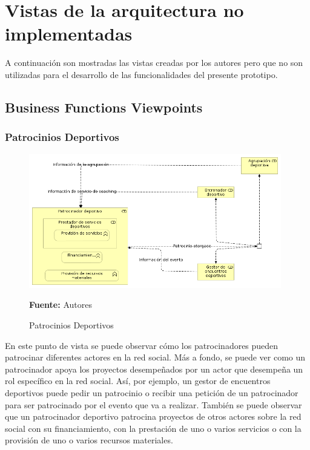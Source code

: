 \chapter{Vistas de la arquitectura no implementadas}
\label{app:vistas_no_implementadas}

A continuación son mostradas las vistas creadas por los autores pero que no son utilizadas para el desarrollo de las funcionalidades del presente prototipo.

\section{Business Functions Viewpoints}

\subsection{Patrocinios Deportivos}

\begin{figure}[!htb]
  \begin{center}
    \includegraphics[width=11cm]{./imagenes/business_functions/patrociniosdeportivos.png}
    \caption{Patrocinios Deportivos}
    \label{fig:bf_patrocinios_deportivos}
    \textbf{Fuente:}  Autores
  \end{center}
\end{figure}

En este punto de vista se puede observar cómo los patrocinadores pueden patrocinar diferentes actores en la red social. Más a fondo, se puede ver como un patrocinador apoya los proyectos desempeñados por un actor que desempeña un rol específico en la red social. Así, por ejemplo, un gestor de encuentros deportivos puede pedir un patrocinio o recibir una petición de un patrocinador para ser patrocinado por el evento que va a realizar. También se puede observar que un patrocinador deportivo patrocina proyectos de otros actores sobre la red social con su financiamiento, con la prestación de uno o varios servicios o con la provisión de uno o varios recursos materiales.

